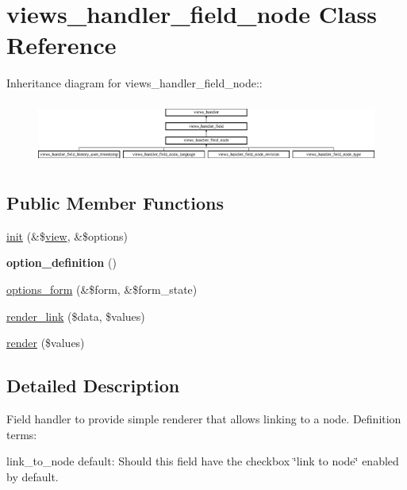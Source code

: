 \hypertarget{classviews__handler__field__node}{
\section{views\_\-handler\_\-field\_\-node Class Reference}
\label{classviews__handler__field__node}
}
Inheritance diagram for views\_\-handler\_\-field\_\-node::\begin{figure}[H]
\begin{center}
\leavevmode
\includegraphics[height=2.06642cm]{classviews__handler__field__node}
\end{center}
\end{figure}
\subsection*{Public Member Functions}
\begin{DoxyCompactItemize}
\item 
\hyperlink{classviews__handler__field__node_a4f263bde5682e4c2285a0e51a7f8b472}{init} (\&\$\hyperlink{classview}{view}, \&\$options)
\item 
\hypertarget{classviews__handler__field__node_ac2daf04495ea792ad0dd60c864f3a77e}{
{\bfseries option\_\-definition} ()}
\label{classviews__handler__field__node_ac2daf04495ea792ad0dd60c864f3a77e}

\item 
\hyperlink{classviews__handler__field__node_af3d8a04be282a20079ea4fb82e768910}{options\_\-form} (\&\$form, \&\$form\_\-state)
\item 
\hyperlink{classviews__handler__field__node_a0ea7eeac3500e011ae0a83e67f56508d}{render\_\-link} (\$data, \$values)
\item 
\hyperlink{classviews__handler__field__node_afe7681e1188ad74ce9b604ad3ba864c0}{render} (\$values)
\end{DoxyCompactItemize}


\subsection{Detailed Description}
Field handler to provide simple renderer that allows linking to a node. Definition terms:
\begin{DoxyItemize}
\item link\_\-to\_\-node default: Should this field have the checkbox \char`\"{}link to node\char`\"{} enabled by default. 
\end{DoxyItemize}

